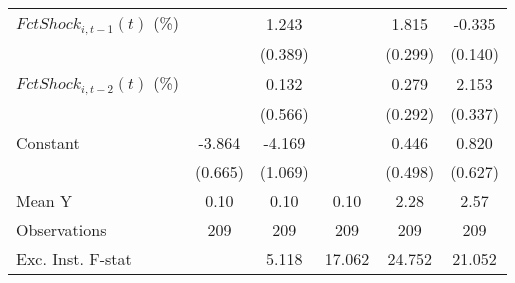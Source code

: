 {\begin{tabular}{l*{5}{c}}
\addlinespace
$ FctShock_{i,t-1}(t)$ (\%)&                     &       1.243\sym{***}&                     &       1.815\sym{***}&      -0.335\sym{**} \\
                    &                     &     (0.389)         &                     &     (0.299)         &     (0.140)         \\
\addlinespace
$ FctShock_{i,t-2}(t)$ (\%)&                     &       0.132         &                     &       0.279         &       2.153\sym{***}\\
                    &                     &     (0.566)         &                     &     (0.292)         &     (0.337)         \\
\addlinespace
Constant            &      -3.864\sym{***}&      -4.169\sym{***}&                     &       0.446         &       0.820         \\
                    &     (0.665)         &     (1.069)         &                     &     (0.498)         &     (0.627)         \\
\midrule
Mean Y              &        0.10         &        0.10         &        0.10         &        2.28         &        2.57         \\
Observations        &         209         &         209         &         209         &         209         &         209         \\
Exc. Inst. F-stat   &                     &       5.118         &      17.062         &      24.752         &      21.052         \\
\bottomrule
\end{tabular}
}

